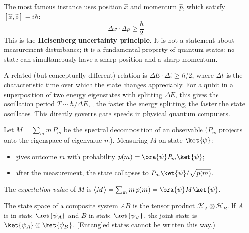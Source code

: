 \documentclass[oneside]{academica}
\begin{document}
The most famous instance uses position $\hat x$ and momentum $\hat p$, which satisfy $[\hat x,\hat p]=i\hbar$:
\begin{equation*}
  \Delta x \cdot \Delta p \ge \frac{\hbar}{2}
\end{equation*}
This is the \textbf{Heisenberg uncertainty principle}.
It is not a statement about measurement disturbance; it is a fundamental property of quantum states: no state can simultaneously have a sharp position and a sharp momentum.

\begin{example*}
  A related (but conceptually different) relation is $\Delta E\cdot\Delta t\ge\hbar/2$, where $\Delta t$ is the characteristic time over which the state changes appreciably.
  For a qubit in a superposition of two energy eigenstates with splitting $\Delta E$, this gives the oscillation period $T\sim\hbar/\Delta E$, \ie, the faster the energy splitting, the faster the state oscillates.
  This directly governs gate speeds in physical quantum computers.
\end{example*}

\begin{postulate}[Measurement]
  Let $M=\sum_m m\,P_m$ be the spectral decomposition of an observable ($P_m$ projects onto the eigenspace of eigenvalue $m$).
  Measuring $M$ on state $\ket{\psi}$:
  \begin{itemize}
    \item gives outcome $m$ with probability $p(m)=\bra{\psi}P_m\ket{\psi}$;
    \item after the measurement, the state collapses to
      $P_m\ket{\psi}/\sqrt{p(m)}$.
  \end{itemize}
  The \emph{expectation value} of $M$ is $\langle M\rangle=\sum_m m\,p(m)=\bra{\psi}M\ket{\psi}$.
\end{postulate}

\begin{postulate}
  The state space of a composite system $AB$ is the tensor product $\mathcal{H}_A\otimes\mathcal{H}_B$.
  If $A$ is in state $\ket{\psi_A}$ and $B$ in state $\ket{\psi_B}$, the joint state is
  $\ket{\psi_A}\otimes\ket{\psi_B}$.
  (Entangled states cannot be written this way.)
\end{postulate}
\end{document}

